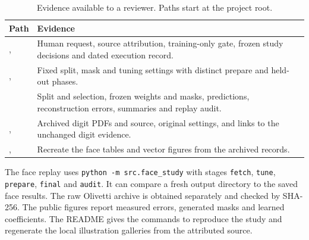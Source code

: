 \begin{table}[H]\small
\caption{Evidence available to a reviewer. Paths start at the project root.}
\begin{tabularx}{\linewidth}{@{}P{56mm}Y@{}}
\toprule
Path & Evidence\\
\midrule
{},  &
Human request, source attribution, training-only gate, frozen study decisions and dated execution record.\\
,  &
Fixed split, mask and tuning settings with distinct prepare and held-out phases.\\
 &
Split and selection, frozen weights and masks, predictions, reconstruction errors, summaries and replay audit.\\
,  &
Archived digit PDFs and source, original settings, and links to the unchanged digit evidence.\\
,  &
Recreate the face tables and vector figures from the archived records.\\
\bottomrule
\end{tabularx}
\end{table}

The face replay uses \texttt{python -m src.face\_study} with stages \texttt{fetch}, \texttt{tune}, \texttt{prepare}, \texttt{final} and \texttt{audit}. It can compare a fresh output directory to the saved face results. The raw Olivetti archive is obtained separately and checked by SHA-256. The public figures report measured errors, generated masks and learned coefficients. The README gives the commands to reproduce the study and regenerate the local illustration galleries from the attributed source.
